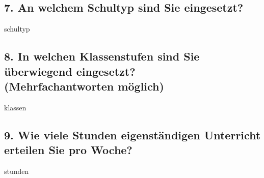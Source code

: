 \documentclass[a4paper,10pt]{article}
\begin{document}
{\subsection*{7. An welchem Schultyp sind Sie eingesetzt?}
\vspace{0.5cm}
\begin{questionmult}{schultyp}
	\begin{choices}
	\end{choices}
\end{questionmult}

\subsection*{8. In welchen Klassenstufen sind Sie überwiegend eingesetzt? \\
	(Mehrfachantworten möglich)}
\vspace{0.5cm}
\begin{questionmult}{klassen}
	\begin{choices}
		\scoring{b=1}
		\scoring{b=2}
		\scoring{b=3}
		\scoring{b=4}
	\end{choices}
\end{questionmult}

\subsection*{9. Wie viele Stunden eigenständigen Unterricht erteilen Sie pro Woche?}
\vspace{0.5cm}
\begin{questionmult}{stunden}
	\begin{choices}
		\scoring{b=5}
	\end{choices}
\end{questionmult}

}
\end{document}
